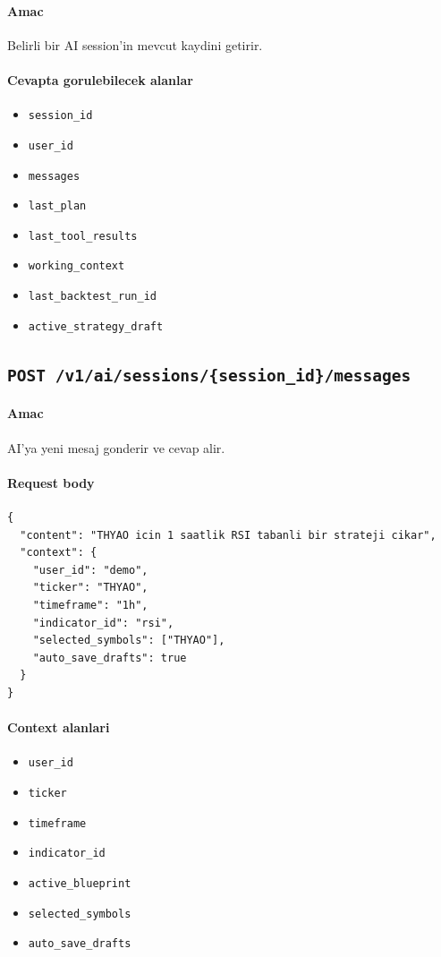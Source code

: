 \documentclass[11pt,a4paper]{article}
\begin{document}
\paragraph{Amac}
Belirli bir AI session'in mevcut kaydini getirir.

\paragraph{Cevapta gorulebilecek alanlar}
\begin{itemize}[leftmargin=1.5em]
    \item \texttt{session\_id}
    \item \texttt{user\_id}
    \item \texttt{messages}
    \item \texttt{last\_plan}
    \item \texttt{last\_tool\_results}
    \item \texttt{working\_context}
    \item \texttt{last\_backtest\_run\_id}
    \item \texttt{active\_strategy\_draft}
\end{itemize}

\subsection{\texttt{POST /v1/ai/sessions/\{session\_id\}/messages}}

\paragraph{Amac}
AI'ya yeni mesaj gonderir ve cevap alir.

\paragraph{Request body}
\begin{lstlisting}
{
  "content": "THYAO icin 1 saatlik RSI tabanli bir strateji cikar",
  "context": {
    "user_id": "demo",
    "ticker": "THYAO",
    "timeframe": "1h",
    "indicator_id": "rsi",
    "selected_symbols": ["THYAO"],
    "auto_save_drafts": true
  }
}
\end{lstlisting}

\paragraph{Context alanlari}
\begin{itemize}[leftmargin=1.5em]
    \item \texttt{user\_id}
    \item \texttt{ticker}
    \item \texttt{timeframe}
    \item \texttt{indicator\_id}
    \item \texttt{active\_blueprint}
    \item \texttt{selected\_symbols}
    \item \texttt{auto\_save\_drafts}
\end{itemize}
\end{document}
